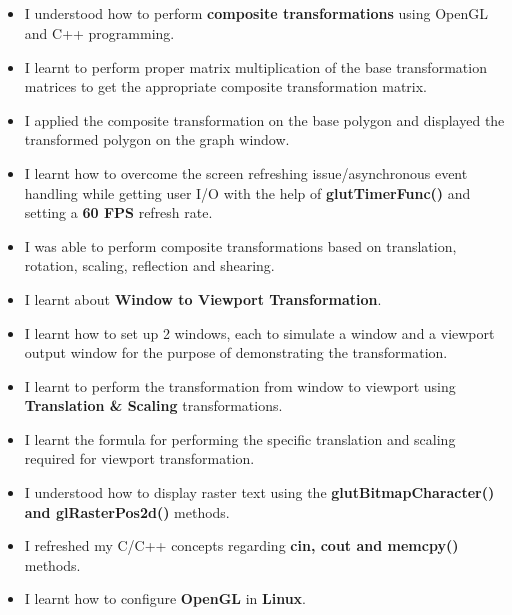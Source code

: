 \documentclass[12pt, a4]{article}
\begin{document}
\subsection*{}
\begin{itemize}
\item I understood how to perform \textbf{composite transformations} using OpenGL and C++ programming.
\item I learnt to perform proper matrix multiplication of the base transformation matrices to get the appropriate composite transformation matrix.
\item I applied the composite transformation on the base polygon and displayed the transformed polygon on the graph window. 
\item I learnt how to overcome the screen refreshing issue/asynchronous event handling while getting user I/O with the help of \textbf{glutTimerFunc()} and setting a \textbf{60 FPS} refresh rate.
\item I was able to perform composite transformations based on translation, rotation, scaling, reflection and shearing.
\item I learnt about \textbf{Window to Viewport Transformation}.
\item I learnt how to set up 2 windows, each to simulate a window and a viewport output window for the purpose of demonstrating the transformation.
\item I learnt to perform the transformation from window to viewport using \textbf{Translation \& Scaling} transformations.
\item I learnt the formula for performing the specific translation and scaling required for viewport transformation.
\item I understood how to display raster text using the \textbf{glutBitmapCharacter() and glRasterPos2d()} methods.
\item I refreshed my C/C++ concepts regarding \textbf{cin, cout and memcpy()} methods.
\item I learnt how to configure \textbf{OpenGL} in \textbf{Linux}.
\end{itemize}
\end{document}
